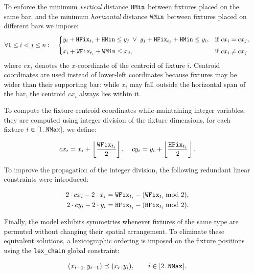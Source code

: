 To enforce the minimum \emph{vertical} distance \( \mathtt{HMin} \) between fixtures placed on the same bar, and the minimum \emph{horizontal} distance \( \mathtt{WMin} \) between fixtures placed on different bars we impose:
\begin{equation*}
	\forall 1 \le i < j \le n: \quad
	\begin{cases}
		y_i + \mathtt{HFix}_{t_i} + \mathtt{HMin} \le y_j
		\;\vee\;
		y_j + \mathtt{HFix}_{t_j} + \mathtt{HMin} \le y_i, & \text{if } cx_i = cx_j,\\[1ex]
		x_i + \mathtt{WFix}_{t_i} + \mathtt{WMin} \le x_j, & \text{if } cx_i \neq cx_j.
	\end{cases}
\end{equation*}
where
\(cx_i\) denotes the $x$-coordinate of the centroid of fixture \( i \).
Centroid coordinates are used instead of lower-left coordinates because fixtures may be wider than their supporting bar: while \( x_i \) may fall outside the horizontal span of the bar, the centroid \( cx_i \) always lies within it.

To compute the fixture centroid coordinates while maintaining integer variables, they are computed using integer division of the fixture dimensions, for each fixture $i \in [1..\mathtt{NMax}]$, we define:

\begin{equation}
	cx_i = x_i + \left\lfloor \frac{\mathtt{WFix}_{t_i}}{2} \right\rfloor, \quad
	cy_i = y_i + \left\lfloor \frac{\mathtt{HFix}_{t_i}}{2} \right\rfloor .
\end{equation}

To improve the propagation of the integer division, the following redundant linear constraints were introduced:

\begin{align*}
	2 \cdot cx_i - 2 \cdot x_i = \mathtt{WFix}_{t_i} - (\mathtt{WFix}_{t_i} \bmod 2), \\
	2 \cdot cy_i - 2 \cdot y_i = \mathtt{HFix}_{t_i} - (\mathtt{HFix}_{t_i} \bmod 2).
\end{align*}

Finally, the model exhibits symmetries whenever fixtures of the same type are permuted without changing their spatial arrangement. To eliminate these equivalent solutions, a lexicographic ordering is imposed on the fixture positions using the \texttt{lex\_chain} global constraint:

\[
(x_{i-1},y_{i-1}) \preceq (x_i,y_i),
\qquad i \in [2..\mathtt{NMax}].
\]
